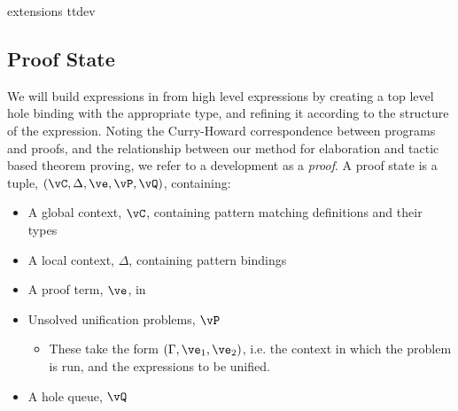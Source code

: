 {\TTdev{} extensions}
{ttdev}


\subsection{Proof State}

\label{sect:prfstate}

We will build expressions in \TT{} from high level \Idris{} expressions by
creating a top level hole binding with the appropriate type, and refining it
according to the structure of the \Idris{} expression. Noting the Curry-Howard
correspondence between programs and proofs, and the relationship between our
method for elaboration and tactic
based theorem proving, we refer to a development as a \emph{proof}.
A proof state is a tuple, $(\vC, \Delta, \ve, \vP, \vQ)$, containing:

\begin{itemize}
\item A global context, $\vC$, containing pattern matching definitions and their types
\item A local context, $\Delta$, containing pattern bindings
\item A proof term, $\ve$, in \TTdev{}
\item Unsolved unification problems, $\vP$
\begin{itemize}
\item These take the form $(\Gamma,\ve_1,\ve_2)$, i.e. the context in which
the problem is run, and the expressions to be unified.
\end{itemize}
\item A hole queue, $\vQ$
\end{itemize}

